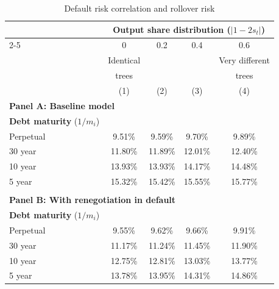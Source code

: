 \begin{table}[h]
\small
\centering
\caption{Default risk correlation and rollover risk}
\label{tab:table_corr_by_maturity}
\begin{tabular*}{\textwidth}{@{\extracolsep{\fill}}lcccc}
\toprule
 & \multicolumn{4}{c}{\textbf{Output share distribution} ($|1-2s_t|$)} \\
\cmidrule{2-5}
  & 0 & 0.2 & 0.4 & 0.6  \\
  & Identical & &  & Very different \\
    & trees & &  & trees \\
    \addlinespace
 & (1) & (2) & (3) & (4)
\\
\multicolumn{5}{l}{\textbf{Panel A: Baseline model}} \\
\midrule
\textbf{Debt maturity} ($1/m_i$) & & & & \\
\multicolumn{1}{l}{Perpetual} & 9.51\% & 9.59\% & 9.70\% & 9.89\% \\
\multicolumn{1}{l}{30 year} & 11.80\% & 11.89\% & 12.01\% & 12.40\% \\
\multicolumn{1}{l}{10 year} & 13.93\% & 13.93\% & 14.17\% & 14.48\% \\
\multicolumn{1}{l}{5 year} & 15.32\% & 15.42\% & 15.55\% & 15.77\% \\
\\
\multicolumn{5}{l}{\textbf{Panel B: With renegotiation in default}} \\
\midrule
\textbf{Debt maturity} ($1/m_i$) & & & & \\
\multicolumn{1}{l}{Perpetual} & 9.55\% & 9.62\% & 9.66\% & 9.91\% \\
\multicolumn{1}{l}{30 year} & 11.17\% & 11.24\% & 11.45\% & 11.90\% \\
\multicolumn{1}{l}{10 year} & 12.75\% & 12.81\% & 13.03\% & 13.77\% \\
\multicolumn{1}{l}{5 year} & 13.78\% & 13.95\% & 14.31\% & 14.86\% \\
\bottomrule
\end{tabular*}
\end{table}
